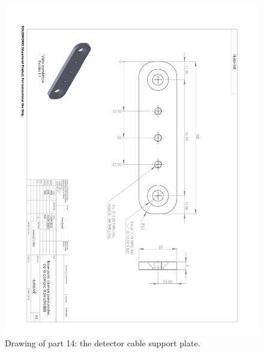 \begin{figure}
\begin{center}
\includegraphics[angle=180,width=0.9\linewidth]{figures/huitzi-f20-part-14.pdf}
\end{center}
\caption{Drawing of part 14: the detector cable support plate.}
\label{figure:huitzi-f20-part-14}
\end{figure}

